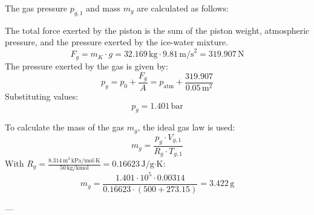 The gas pressure \( p_{g,1} \) and mass \( m_g \) are calculated as follows:  

The total force exerted by the piston is the sum of the piston weight, atmospheric pressure, and the pressure exerted by the ice-water mixture.  
\[
F_g = m_K \cdot g = 32.169 \, \text{kg} \cdot 9.81 \, \text{m/s}^2 = 319.907 \, \text{N}
\]  
The pressure exerted by the gas is given by:  
\[
p_g = p_0 + \frac{F_g}{A} = p_{\text{atm}} + \frac{319.907}{0.05 \, \text{m}^2}
\]  
Substituting values:  
\[
p_g = 1.401 \, \text{bar}
\]  

To calculate the mass of the gas \( m_g \), the ideal gas law is used:  
\[
m_g = \frac{p_g \cdot V_{g,1}}{R_g \cdot T_{g,1}}
\]  
With \( R_g = \frac{8.314 \, \text{m}^3 \, \text{kPa}/\text{mol·K}}{50 \, \text{kg/kmol}} = 0.16623 \, \text{J/g·K} \):  
\[
m_g = \frac{1.401 \cdot 10^5 \cdot 0.00314}{0.16623 \cdot (500 + 273.15)} = 3.422 \, \text{g}
\]  

---